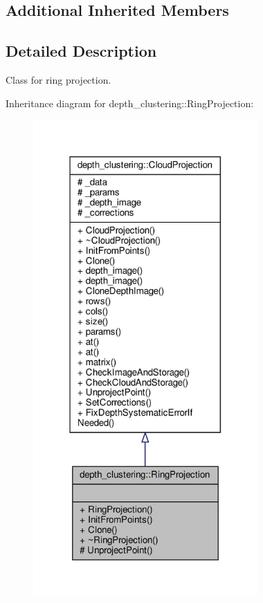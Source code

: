 \subsection*{Additional Inherited Members}


\subsection{Detailed Description}
Class for ring projection. 

Inheritance diagram for depth\+\_\+clustering\+:\+:Ring\+Projection\+:\nopagebreak
\begin{figure}[H]
\begin{center}
\leavevmode
\includegraphics[width=243pt]{classdepth__clustering_1_1RingProjection__inherit__graph}
\end{center}
\end{figure}


